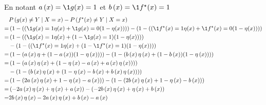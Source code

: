 {\begin{enumerate}
		      \begin{reponse}
			      En notant $a\left( x\right) = \1{g(x) = 1}$ et $b\left( x\right) = \1{f^{\star}(x) = 1}$
			      \begin{align*}
				         & P\left(g(x) \neq Y \mid X = x\right) - P\left(f^{\star}(x) \neq Y \mid X = x\right)                                                                                                                      \\
				      =  &
				      \left(1 - ((\1{g(x) = 1} \eta(x) + \1{g(x) = 0} (1 - \eta(x)))\right)-\left(1 - ((\1{f^{\star}(x) = 1} \eta(x) + \1{f^{\star}(x) = 0}(1 - \eta(x)))\right)                                                   \\
				      =  & \left(1 - ((\1{g(x) = 1} \eta(x) + (1 - \1{g(x) = 1}) (1 - \eta(x)))\right)                                                                                                                               \\
				      {} & -\left(1 - ((\1{f^{\star}(x) = 1} \eta(x) + (1 - \1{f^{\star}(x) = 1}) (1 - \eta(x)))\right)                                                                                                            \\
				      =  & \left(1 - (a\left( x\right) \eta + (1 - a\left( x\right))(1 - \eta\left(x\right)))\right)-\left(1 - (b\left( x\right) \eta\left(x\right) + (1 - b\left( x\right))(1 - \eta\left(x\right)))\right)         \\
				      =  & \left(1 - (a\left( x\right) \eta\left(x\right) + (1 - \eta\left(x\right) - a\left( x\right) + a\left( x\right) \eta\left(x\right)))\right)                                                                \\
				      {} & -\left(1 - (b\left( x\right) \eta\left(x\right) + (1 - \eta\left(x\right) - b\left( x\right) + b\left( x\right) \eta\left(x\right)))\right)                                                               \\
				      =  & \left(1 - (2 a\left( x\right) \eta\left(x\right) + 1 - \eta\left(x\right) - a\left( x\right))\right)-\left(1 - (2 b\left( x\right) \eta\left(x\right) + 1 - \eta\left(x\right) - b\left( x\right))\right) \\
				      =  & \left(-2 a\left( x\right) \eta\left(x\right) + \eta\left(x\right) + a\left( x\right)\right)-\left(-2 b\left( x\right) \eta\left(x\right) + \eta\left(x\right) + b\left( x\right)\right)                   \\
				      =  & 2 b\left( x\right) \eta\left(x\right) - 2 a\left( x\right) \eta\left(x\right) + b\left( x\right) -a\left( x\right)                                                                                        \\

\end{align*}
\end{reponse}
\end{enumerate}}

